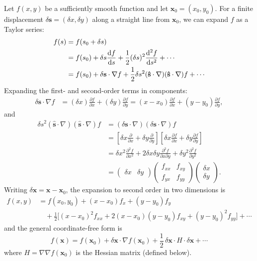 \documentclass[a4paper]{article}
\begin{document}
\begin{prop}
  Let $f(x, y)$ be a sufficiently smooth function and let $\mathbf{x}_0 = (x_0, y_0)$. For a finite displacement $\delta \mathbf{s} = (\delta x, \delta y)$ along a straight line from $\mathbf{x}_0$, we can expand $f$ as a Taylor series:
  \begin{align*}
    f(s) &= f(s_0 + \delta s)\\
    &=f(s_0) + \delta s\frac{\mathrm{d} f}{\mathrm{d} s} + \frac{1}{2}(\delta s)^2\frac{\mathrm{d} ^2 f}{\mathrm{d} s^2} + \cdots\\
    &= f(s_0) + \delta \mathbf{s} \cdot \nabla f + \frac{1}{2}\delta s^2 (\mathbf{\hat{s}}\cdot \nabla)(\mathbf{\hat{s}}\cdot \nabla)f + \cdots
  \end{align*}
  Expanding the first- and second-order terms in components:
  \begin{align*}
    \delta \mathbf{s}\cdot \nabla f &= (\delta x)\frac{\partial f}{\partial x} + (\delta y)\frac{\partial f}{\partial y} = (x - x_0)\frac{\partial f}{\partial x} + (y - y_0)\frac{\partial f}{\partial y},
  \end{align*}
  and
  \begin{align*}
    \delta s^2 (\mathbf{\hat{s}}\cdot \nabla)(\mathbf{\hat{s}}\cdot \nabla)f &= (\delta \mathbf{s}\cdot \nabla)(\delta \mathbf{s}\cdot \nabla) f\\
    &= \left[\delta x\frac{\partial }{\partial x} + \delta y\frac{\partial}{\partial y}\right]\left[\delta x\frac{\partial f}{\partial x} + \delta y\frac{\partial f}{\partial y}\right]\\
    &= \delta x^2 \frac{\partial^2 f}{\partial x^2} + 2\delta x\delta y\frac{\partial^2 f}{\partial x\partial y} + \delta y^2 \frac{\partial^2 f}{\partial y^2}\\
    &=
    \begin{pmatrix}
      \delta x& \delta y
    \end{pmatrix}
    \begin{pmatrix}
      f_{xx}&f_{xy}\\
      f_{yx}&f_{yy}
    \end{pmatrix}
    \begin{pmatrix}
      \delta x\\\delta y
    \end{pmatrix}.
  \end{align*}
  Writing $\delta\mathbf{x} = \mathbf{x} - \mathbf{x}_0$, the expansion to second order in two dimensions is
  \begin{align*}
    f(x, y) &= f(x_0, y_0) + (x - x_0)f_x + (y - y_0)f_y \\
    &\quad+ \frac{1}{2}\bigl[(x - x_0)^2 f_{xx} + 2(x - x_0)(y - y_0)f_{xy} + (y - y_0)^2 f_{yy}\bigr] + \cdots
  \end{align*}
  and the general coordinate-free form is
  \[
    f(\mathbf{x}) = f(\mathbf{x}_0) + \delta \mathbf{x}\cdot\nabla f(\mathbf{x}_0) + \frac{1}{2}\,\delta \mathbf{x}\cdot H\cdot \delta \mathbf{x} + \cdots
  \]
  where $H = \nabla\nabla f(\mathbf{x}_0)$ is the Hessian matrix (defined below).
\end{prop}
\end{document}
